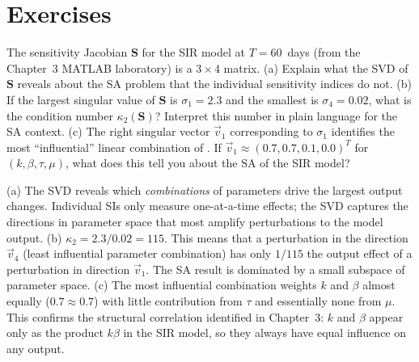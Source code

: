 \section{Exercises}
\label{appsec:C_exercises}

\begin{selfcheck}
The sensitivity Jacobian $\mathbf{S}$ for the SIR model at $T = 60$~days
(from the Chapter~3 MATLAB laboratory) is a $3\times4$ matrix.
(a) Explain what the SVD of $\mathbf{S}$ reveals about the SA problem
that the individual sensitivity indices do not.
(b) If the largest singular value of $\mathbf{S}$ is $\sigma_1 = 2.3$
and the smallest is $\sigma_4 = 0.02$, what is the condition number
$\kappa_2(\mathbf{S})$? Interpret this number in plain language for
the SA context.
(c) The right singular vector $\vec{v}_1$ corresponding to $\sigma_1$
identifies the most ``influential'' linear combination of \POIs.
If $\vec{v}_1 \approx (0.7, 0.7, 0.1, 0.0)^T$ for \POIs
$(k, \beta, \tau, \mu)$, what does this tell you about the
SA of the SIR model?
\end{selfcheck}
\begin{scAnswer}
(a) The SVD reveals which \emph{combinations} of parameters drive the
largest output changes. Individual SIs only measure one-at-a-time effects;
the SVD captures the directions in parameter space that most amplify
perturbations to the model output.
(b) $\kappa_2 = 2.3/0.02 = 115$. This means that a perturbation in
the direction $\vec{v}_4$ (least influential parameter combination)
has only $1/115$ the output effect of a perturbation in direction $\vec{v}_1$.
The SA result is dominated by a small subspace of parameter space.
(c) The most influential combination weights $k$ and $\beta$ almost equally
($0.7\approx0.7$) with little contribution from $\tau$ and essentially none
from $\mu$. This confirms the structural correlation identified in Chapter~3:
$k$ and $\beta$ appear only as the product $k\beta$ in the SIR model,
so they always have equal influence on any output.
\end{scAnswer}

